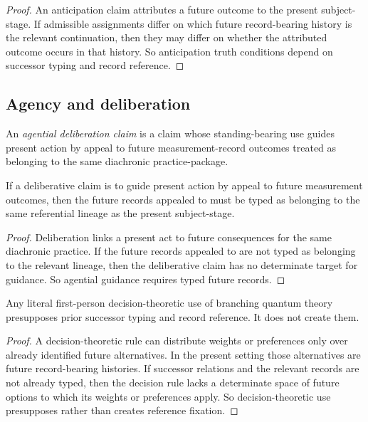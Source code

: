 \begin{proof}
An anticipation claim attributes a future outcome to the present subject-stage. If admissible
assignments differ on which future record-bearing history is the relevant continuation, then they may
differ on whether the attributed outcome occurs in that history. So anticipation truth conditions
depend on successor typing and record reference.
\end{proof}

\subsection{Agency and deliberation}

\begin{definition}
An \emph{agential deliberation claim} is a claim whose standing-bearing use guides present action by
appeal to future measurement-record outcomes treated as belonging to the same diachronic
practice-package.
\end{definition}

\begin{lemma}
\label{lem:agency-typed}
If a deliberative claim is to guide present action by appeal to future measurement outcomes, then the
future records appealed to must be typed as belonging to the same referential lineage as the present
subject-stage.
\end{lemma}

\begin{proof}
Deliberation links a present act to future consequences for the same diachronic practice. If the future
records appealed to are not typed as belonging to the relevant lineage, then the deliberative claim has
no determinate target for guidance. So agential guidance requires typed future records.
\end{proof}

\begin{theorem}
\label{thm:decision-theoretic-dependence}
\label{prop:decision-presupposes-fixation}
Any literal first-person decision-theoretic use of branching quantum theory presupposes prior
successor typing and record reference. It does not create them.
\end{theorem}

\begin{proof}
A decision-theoretic rule can distribute weights or preferences only over already identified future
alternatives. In the present setting those alternatives are future record-bearing histories. If successor
relations and the relevant records are not already typed, then the decision rule lacks a determinate
space of future options to which its weights or preferences apply. So decision-theoretic use
presupposes rather than creates reference fixation.
\end{proof}

